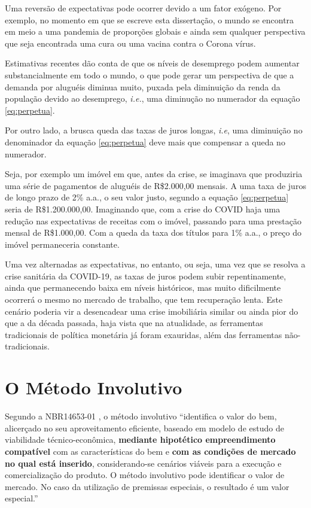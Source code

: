 \documentclass[
	12pt,				%
	oneside,			%
	a4paper,			%
	chapter=TITLE,		%
	section=TITLE,		%
	english,			%
	brazil				%
	]{abntex2}
\begin{document}
Uma reversão de expectativas pode ocorrer devido a um fator exógeno. Por
exemplo, no momento em que se escreve esta dissertação, o mundo se
encontra em meio a uma pandemia de proporções globais e ainda sem
qualquer perspectiva que seja encontrada uma cura ou uma vacina contra o
Corona vírus.

Estimativas recentes dão conta de que os níveis de desemprego podem
aumentar substancialmente em todo o mundo, o que pode gerar um
perspectiva de que a demanda por aluguéis diminua muito, puxada pela
diminuição da renda da população devido ao desemprego, \emph{i.e.}, uma
diminução no numerador da equação \eqref{eq:perpetua}.

Por outro lado, a brusca queda das taxas de juros longas, \emph{i.e},
uma diminuição no denominador da equação \eqref{eq:perpetua} deve mais que
compensar a queda no numerador.

Seja, por exemplo um imóvel em que, antes da crise, se imaginava que
produziria uma série de pagamentos de aluguéis de R\$2.000,00 mensais. A
uma taxa de juros de longo prazo de 2\% a.a., o seu valor justo, segundo
a equação \eqref{eq:perpetua} seria de R\$1.200.000,00. Imaginando que,
com a crise do COVID haja uma redução nas expectativas de receitas com o
imóvel, passando para uma prestação mensal de R\$1.000,00. Com a queda
da taxa dos títulos para 1\% a.a., o preço do imóvel permaneceria
constante.

Uma vez alternadas as expectativas, no entanto, ou seja, uma vez que se
resolva a crise sanitária da COVID-19, as taxas de juros podem subir
repentinamente, ainda que permanecendo baixa em níveis históricos, mas
muito dificilmente ocorrerá o mesmo no mercado de trabalho, que tem
recuperação lenta. Este cenário poderia vir a desencadear uma crise
imobiliária similar ou ainda pior do que a da década passada, haja vista
que na atualidade, as ferramentas tradicionais de política monetária já
foram exauridas, além das ferramentas não-tradicionais.

\hypertarget{involutivo}{\chapter{O Método
Involutivo}\label{involutivo}}

Segundo a NBR14653-01 \autocite*[14]{NBR1465301}, o método involutivo
``identifica o valor do bem, alicerçado no seu aproveitamento eficiente,
baseado em modelo de estudo de viabilidade técnico-econômica,
\textbf{mediante hipotético empreendimento compatível} com as
características do bem e \textbf{com as condições de mercado no qual
está inserido}, considerando-se cenários viáveis para a execução e
comercialização do produto. O método involutivo pode identificar o valor
de mercado. No caso da utilização de premissas especiais, o resultado é
um valor especial.''
\end{document}
